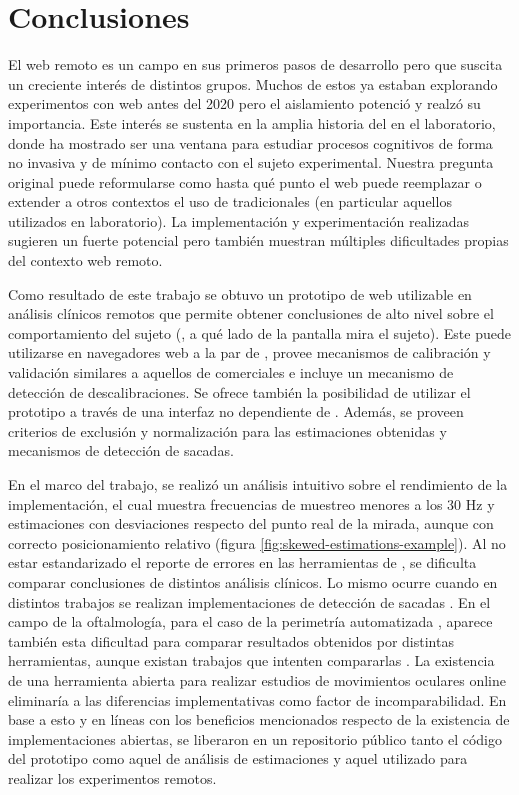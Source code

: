 \chapter{Conclusiones}

El \eyetracking web remoto es un campo en sus primeros pasos de desarrollo pero
que suscita un creciente interés de distintos grupos.
Muchos de estos ya estaban explorando experimentos con \eyetracking web antes
del 2020 pero el aislamiento potenció y realzó su importancia.
Este interés se sustenta en la amplia historia del \eyetracking en el
laboratorio, donde ha mostrado ser una ventana para estudiar procesos
cognitivos de forma no invasiva y de mínimo contacto con el sujeto
experimental.
Nuestra pregunta original puede reformularse como hasta qué punto el
\eyetracking web puede reemplazar o extender a otros contextos el uso de
\eyetrackers tradicionales (en particular aquellos utilizados en laboratorio).
La implementación y experimentación realizadas sugieren un fuerte potencial
pero también muestran múltiples dificultades propias del contexto web remoto.

Como resultado de este trabajo se obtuvo un prototipo de \eyetracker web
utilizable en análisis clínicos remotos que permite obtener conclusiones de
alto nivel sobre el comportamiento del sujeto (\eg, a qué lado de la pantalla
mira el sujeto).
Este puede utilizarse en navegadores web a la par de \jspsych, provee
mecanismos de calibración y validación similares a aquellos de \eyetrackers
comerciales e incluye un mecanismo de detección de descalibraciones.
Se ofrece también la posibilidad de utilizar el prototipo a través de una
interfaz no dependiente de \jspsych.
Además, se proveen criterios de exclusión y normalización para las estimaciones
obtenidas y mecanismos de detección de sacadas.

En el marco del trabajo, se realizó un análisis intuitivo sobre el rendimiento
de la implementación, el cual muestra frecuencias de muestreo menores a los 30
Hz y estimaciones con desviaciones respecto del punto real de la mirada, aunque
con correcto posicionamiento relativo (figura
\ref{fig:skewed-estimations-example}).
Al no estar estandarizado el reporte de errores en las herramientas de
\eyetracking \cite{zandi_2021_pupilext}, se dificulta comparar conclusiones de
distintos análisis clínicos.
Lo mismo ocurre cuando en distintos trabajos se realizan implementaciones
\adhoc de detección de sacadas \cite{salvucci_2000_identifying_fixations}.
En el campo de la oftalmología, para el caso de la perimetría automatizada
\cite{pubmed_1996_automated_perimetry}, aparece también esta dificultad para
comparar resultados obtenidos por distintas herramientas, aunque existan
trabajos que intenten compararlas
\cite{landers_2007_automated_perimeters_comparison}.
La existencia de una herramienta abierta para realizar estudios de movimientos
oculares online eliminaría a las diferencias implementativas como factor de
incomparabilidad.
En base a esto y en líneas con los beneficios mencionados respecto de la
existencia de implementaciones abiertas, se liberaron en un repositorio público
tanto el código del prototipo como aquel de análisis de estimaciones y aquel
utilizado para realizar los experimentos remotos.


